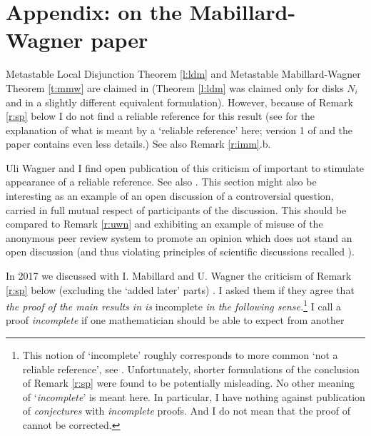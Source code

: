 \documentclass[12pt]{article}
\newcommand{\aronly}[1]{#1}
\theoremstyle{plain}
\theoremstyle{definition}
\begin{document}
\aronly{

\section{Appendix: on the Mabillard-Wagner paper}\label{s:apmawa}

Metastable Local Disjunction Theorem \ref{l:ldm} and Metastable Mabillard-Wagner Theorem \ref{t:mmw}
are claimed in \cite{MW16, MW16'}
(Theorem \ref{l:ldm} was claimed only for disks $N_i$ and in a slightly different equivalent formulation).
However, because of Remark \ref{r:sp} below I do not find \cite{MW16} a reliable reference for this result
(see  \cite[p. 2]{Sk21d} for the explanation of what is meant by a `reliable reference' here;
version 1 of \cite{MW16} and the paper \cite{MW16'} contains even less details.)
See also Remark \ref{r:imm}.b.

Uli Wagner and I find open publication of this criticism of \cite{MW16, MW16'} important to stimulate appearance of a reliable reference.
See also \cite[Examples 3.2 and 3.3]{Sk21d}.
This section might also be interesting as an example of an open discussion of a controversial question,
carried in full mutual respect of participants of the discussion.
This should be compared to Remark \ref{r:uwn} and \cite[\S6]{Sk21d} exhibiting an example of misuse of the anonymous peer review system to promote an opinion which does not stand an open discussion (and thus violating principles of scientific discussions recalled \cite[Remark 4.2.b]{Sk21d}).


In 2017 we discussed with I. Mabillard and U. Wagner the criticism of Remark \ref{r:sp} below (excluding the `added later' parts) \cite{Sk17o}.
I asked them if they agree that {\it the proof of the main results in \cite{MW16} is} incomplete {\it in the following sense.}\footnote{This notion of `incomplete' roughly corresponds to more common `not a reliable reference', see \cite[p. 2]{Sk21d}. Unfortunately, shorter formulations of the conclusion of Remark \ref{r:sp} were found to be potentially misleading.
No other meaning of `{\it incomplete}' is meant here.
In particular, I have nothing against publication of {\it conjectures} with {\it incomplete} proofs.
And I do not mean that the proof of \cite{MW16} cannot be corrected.}
I call a proof {\it incomplete} if one mathematician should be able to expect from another

}
\end{document}
